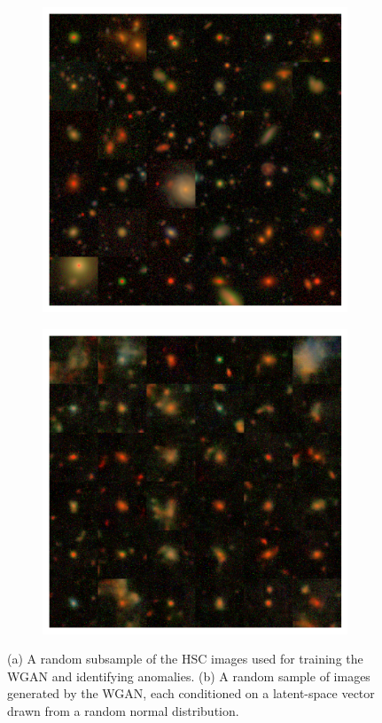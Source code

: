 \begin{figure}
    \begin{subfigure}{.4\textwidth}
    \centering
    \includegraphics[width=1\linewidth]{sample_real}
    \caption{}
    \label{fig:real}
    \end{subfigure}
    \hspace{4em}
    \begin{subfigure}{.4\textwidth}
    \centering
    \includegraphics[width=1\linewidth]{sample_gan}
    \caption{}
    \label{fig:gen}
    \end{subfigure}
\caption{(a) A random subsample of the HSC images used for training the WGAN and identifying anomalies. (b) A random sample of images generated by the WGAN, each conditioned on a latent-space vector drawn from a random normal distribution.}
\end{figure}

